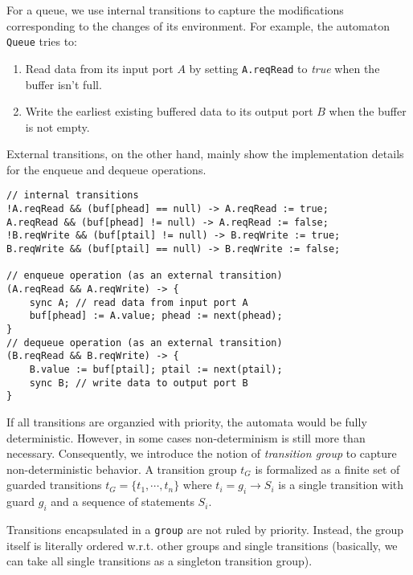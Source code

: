 \begin{example} For a queue, we use internal transitions to capture the modifications corresponding to the changes of its environment. For example, the automaton \texttt{Queue}  tries to:
\begin{enumerate}
    \item Read data from its input port $A$ by setting \texttt{A.reqRead} to \emph{true} when the buffer isn't full.
    \item Write the earliest existing buffered data to its output port $B$ when the buffer is not empty. 
\end{enumerate}
External transitions, on the other hand, mainly show the implementation details for the enqueue and dequeue operations.
\begin{lstlisting}[basicstyle=\scriptsize\ttfamily]
// internal transitions
!A.reqRead && (buf[phead] == null) -> A.reqRead := true;
A.reqRead && (buf[phead] != null) -> A.reqRead := false;
!B.reqWrite && (buf[ptail] != null) -> B.reqWrite := true;
B.reqWrite && (buf[ptail] == null) -> B.reqWrite := false;

// enqueue operation (as an external transition)
(A.reqRead && A.reqWrite) -> {
    sync A; // read data from input port A
    buf[phead] := A.value; phead := next(phead);
}
// dequeue operation (as an external transition)
(B.reqRead && B.reqWrite) -> {
    B.value := buf[ptail]; ptail := next(ptail);
    sync B; // write data to output port B
}
\end{lstlisting}
\label{exp:trans_queue}
\end{example}

If all transitions are organzied with priority, the automata would be fully deterministic. However, in some cases non-determinism is still more than necessary. Consequently, we introduce the notion of \emph{transition group} to capture non-deterministic behavior. A transition group $t_G$ is formalized as a finite set of guarded transitions
$t_G=\{t_1,\cdots, t_n\}$ where $t_i=g_i\rightarrow S_i$ is a single transition with guard $g_i$ and a sequence of statements $S_i$.

Transitions encapsulated in a \texttt{group} are not ruled by priority. Instead, the group itself is literally ordered w.r.t. other groups and single transitions (basically, we can take all single transitions as a singleton transition group).

